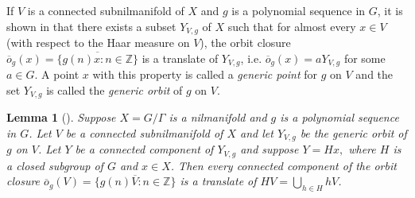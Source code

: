 \documentclass{article}
\theoremstyle{plain}
\newtheorem{lemma}[Theorem]{Lemma}
\theoremstyle{claim}
\theoremstyle{definition}
\theoremstyle{plain}
\theoremstyle{plain}
\newcommand{\Z}{\mathbb{Z}}
\newcommand{\1}{\boldsymbol{1}}
\newcommand{\orb}{\overline{o}}
\begin{document}
If $V$ is a connected subnilmanifold of $X$ and $g$ is a polynomial sequence in $G$, it is shown in \cite[Theorem 2.3]{Leibman07} that there exists a subset $Y_{V, g}$ of $X$ such that for almost every $x \in V$ (with respect to the Haar measure on $V$), the orbit closure $\orb_g(x) = \overline{\{g(n) x: n \in \Z\}}$ is a translate of $Y_{V, g}$, i.e. $\orb_g(x) = a Y_{V, g}$ for some $a \in G$.
A point $x$ with this property is called a \emph{generic point} for $g$ on $V$ and the set $Y_{V, g}$ is called the \emph{generic orbit} of $g$ on $V$.

\begin{lemma}[{\cite[Theorem 5.9]{Leibman07}}]
\label{lem:leibman_connected_components_of_translate_subnilmanifold}
Suppose $X = G/\Gamma$ is a nilmanifold and $g$ is a polynomial sequence in $G$. Let $V$ be a connected subnilmanifold of $X$ and let $Y_{V, g}$ be the generic orbit of $g$ on $V$. Let $Y$ be a connected component of $Y_{V, g}$ and suppose $Y = Hx,$ where $H$ is a closed subgroup of $G$ and $x \in X$. 
Then every connected component of the orbit closure $\orb_g(V) = \overline{\{g(n) V: n \in \Z\}}$ is a translate of $HV = \bigcup_{h \in H} hV$.
\end{lemma}
\end{document}
